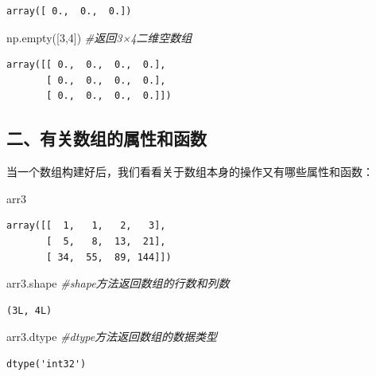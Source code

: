 \documentclass[]{article}
\newenvironment{Shaded}{\begin{snugshade}}{\end{snugshade}}
\newcommand{\DecValTok}[1]{\textcolor[rgb]{0.00,0.00,0.81}{#1}}
\newcommand{\CommentTok}[1]{\textcolor[rgb]{0.56,0.35,0.01}{\textit{#1}}}
\newcommand{\NormalTok}[1]{#1}
\begin{document}
\begin{verbatim}
array([ 0.,  0.,  0.])
\end{verbatim}

\begin{Shaded}
\begin{Highlighting}[]
\NormalTok{np.empty([}\DecValTok{3}\NormalTok{,}\DecValTok{4}\NormalTok{]) }\CommentTok{#返回3×4二维空数组}
\end{Highlighting}
\end{Shaded}

\begin{verbatim}
array([[ 0.,  0.,  0.,  0.],
       [ 0.,  0.,  0.,  0.],
       [ 0.,  0.,  0.,  0.]])
\end{verbatim}

\subsection{二、有关数组的属性和函数}

当一个数组构建好后，我们看看关于数组本身的操作又有哪些属性和函数：

\begin{Shaded}
\begin{Highlighting}[]
\NormalTok{arr3}
\end{Highlighting}
\end{Shaded}

\begin{verbatim}
array([[  1,   1,   2,   3],
       [  5,   8,  13,  21],
       [ 34,  55,  89, 144]])
\end{verbatim}

\begin{Shaded}
\begin{Highlighting}[]
\NormalTok{arr3.shape }\CommentTok{#shape方法返回数组的行数和列数}
\end{Highlighting}
\end{Shaded}

\begin{verbatim}
(3L, 4L)
\end{verbatim}

\begin{Shaded}
\begin{Highlighting}[]
\NormalTok{arr3.dtype  }\CommentTok{#dtype方法返回数组的数据类型}
\end{Highlighting}
\end{Shaded}

\begin{verbatim}
dtype('int32')
\end{verbatim}
\end{document}
